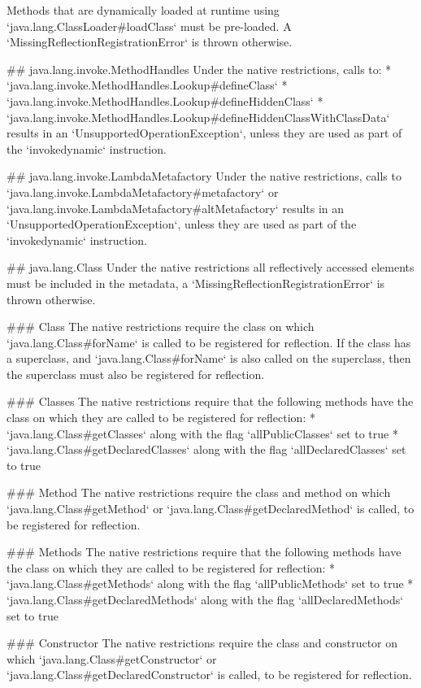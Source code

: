 Methods that are dynamically loaded at runtime using `java.lang.ClassLoader#loadClass` must be pre-loaded.
A `MissingReflectionRegistrationError` is thrown otherwise.

## java.lang.invoke.MethodHandles
Under the native restrictions, calls to: 
* `java.lang.invoke.MethodHandles.Lookup#defineClass`
* `java.lang.invoke.MethodHandles.Lookup#defineHiddenClass`
* `java.lang.invoke.MethodHandles.Lookup#defineHiddenClassWithClassData`
results in an `UnsupportedOperationException`, unless they are used as part of the `invokedynamic` instruction.


## java.lang.invoke.LambdaMetafactory
Under the native restrictions, calls to `java.lang.invoke.LambdaMetafactory#metafactory` or
`java.lang.invoke.LambdaMetafactory#altMetafactory` results in an `UnsupportedOperationException`, unless
they are used as part of the `invokedynamic` instruction.

## java.lang.Class
Under the native restrictions all reflectively accessed elements must be included in the metadata,
a `MissingReflectionRegistrationError` is thrown otherwise.

### Class
The native restrictions require the class on which `java.lang.Class#forName` is called to be registered for reflection.
If the class has a superclass, and `java.lang.Class#forName` is also called on the superclass, then the superclass must also
be registered for reflection.

### Classes
The native restrictions require that the following methods have the class on which they are called to be registered for reflection:
* `java.lang.Class#getClasses` along with the flag `allPublicClasses` set to true
* `java.lang.Class#getDeclaredClasses` along with the flag `allDeclaredClasses` set to true

### Method
The native restrictions require the class and method on which `java.lang.Class#getMethod` or 
`java.lang.Class#getDeclaredMethod` is called, to be registered for reflection.

### Methods
The native restrictions require that the following methods have the class on which they are called to be registered for reflection:
* `java.lang.Class#getMethods` along with the flag `allPublicMethods` set to true
* `java.lang.Class#getDeclaredMethods` along with the flag `allDeclaredMethods` set to true

### Constructor
The native restrictions require the class and constructor on which `java.lang.Class#getConstructor` or
`java.lang.Class#getDeclaredConstructor` is called, to be registered for reflection.

